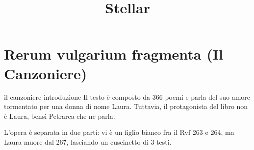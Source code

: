 \documentclass[preview]{standalone}
\begin{document}
\title{Stellar}
\genpage

\section{Rerum vulgarium fragmenta (Il Canzoniere)}

\begin{snippet}{il-canzoniere-introduzione}
    Il testo è composto da 366 poemi e parla del suo amore tormentato per una donna di nome Laura.
    Tuttavia, il protagonista del libro non è Laura, bensì Petrarca che ne parla.
    
    L'opera è separata in due parti: vi è un figlio bianco fra il Rvf 263 e 264,
    ma Laura muore dal 267, lasciando un cuscinetto di 3 testi.
\end{snippet}
\end{document}
